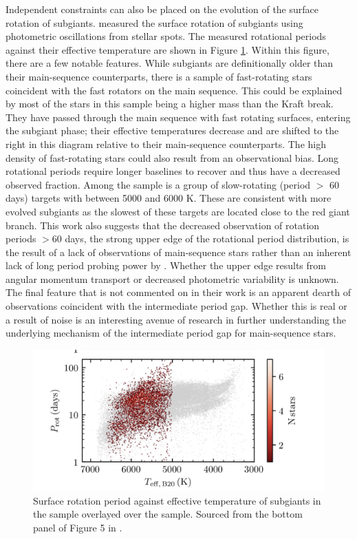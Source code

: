 Independent constraints can also be placed on the evolution of the surface rotation of subgiants.
\citet{santos_surface_2021} measured the surface rotation of  subgiants using photometric oscillations from stellar spots.
The measured rotational periods against their effective temperature are shown in Figure \ref{fig:subgiant_surface}.
Within this figure, there are a few notable features.
While subgiants are definitionally older than their main-sequence counterparts, there is a sample of fast-rotating stars coincident with the fast rotators on the main sequence.
This could be explained by most of the stars in this sample being a higher mass than the Kraft break.
They have passed through the main sequence with fast rotating surfaces, entering the subgiant phase; their effective temperatures decrease and are shifted to the right in this diagram relative to their main-sequence counterparts.
The high density of fast-rotating stars could also result from an observational bias.
Long rotational periods require longer baselines to recover and thus have a decreased observed fraction.
Among the sample is a group of slow-rotating (period $>$ 60 days) targets with \teff{} between 5000 and 6000 K.
These are consistent with more evolved subgiants as the slowest of these targets are located close to the red giant branch.
This work also suggests that the decreased observation of rotation periods $>$60 days, the strong upper edge of the \citet{mcquillan_rotation_2014} rotational period distribution, is the result of a lack of observations of main-sequence stars rather than an inherent lack of long period probing power by \kepler. 
Whether the upper edge results from angular momentum transport or decreased photometric variability is unknown.
The final feature that is not commented on in their work is an apparent dearth of observations coincident with the intermediate period gap.
Whether this is real or a result of noise is an interesting avenue of research in further understanding the underlying mechanism of the intermediate period gap for main-sequence stars.

\begin{figure}[h]
    \includegraphics[width=\textwidth]{Figures/intro_figures/subgiant_surface.png}
    \caption[Surface rotation period distribution of subgiant stars]{Surface rotation period against effective temperature of subgiants in the \citet{santos_surface_2021} sample overlayed over the \kepler{} \citet{mcquillan_rotation_2014} sample. 
    Sourced from the bottom panel of Figure 5 in \citep{santos_surface_2021}.}
    \label{fig:subgiant_surface}
\end{figure}

